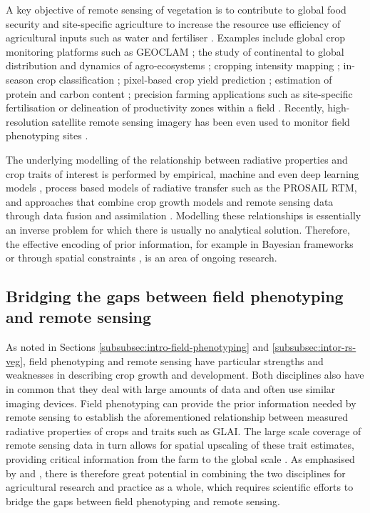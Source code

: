 A key objective of remote sensing of vegetation is to contribute to global food security and site-specific agriculture to increase the resource use efficiency of agricultural inputs such as water and fertiliser \citep{bach_sustainable_2018}. Examples include global crop monitoring platforms such as \gls{GEOCLAM} \citep{becker-reshef_strengthening_2020}; the study of continental to global distribution and dynamics of agro-ecosystems \citep{bolton_continental-scale_2020, dandrimont_detecting_2020, winkler_global_2021, moon_multiscale_2021}; cropping intensity mapping \citep{liu_mapping_2020}; in-season crop classification \citep{ruswurm_end--end_2023}; pixel-based crop yield prediction \citep{perich_pixel-based_2023}; estimation of protein and carbon content \cite{feret_prospect-pro_2021, longmire_estimation_2023}; precision farming applications such as site-specific fertilisation \citep{argento_site-specific_2021} or delineation of productivity zones within a field \citep{georgi_automatic_2018}. Recently, high-resolution satellite remote sensing imagery has been even used to monitor field phenotyping sites \citep{pinto_satellite_2023}.

The underlying modelling of the relationship between radiative properties and crop traits of interest is performed by empirical, machine and even deep learning models \citep{verrelst_quantifying_2019}, process based models of radiative transfer \citep{jacquemoud_prospectsail_2009} such as the PROSAIL \gls{RTM}, and approaches that combine crop growth models and remote sensing data through data fusion and assimilation \citep{ma_wheat_2022}. Modelling these relationships is essentially an inverse problem for which there is usually no analytical solution. Therefore, the effective encoding of prior information, for example in Bayesian frameworks \citep{zhang_towards_2023} or through spatial constraints \citep{atzberger_spatially_2012}, is an area of ongoing research.

\subsection{Bridging the gaps between field phenotyping and remote sensing}
As noted in Sections \ref{subsubsec:intro-field-phenotyping} and \ref{subsubsec:intor-rs-veg}, field phenotyping and remote sensing have particular strengths and weaknesses in describing crop growth and development. Both disciplines also have in common that they deal with large amounts of data and often use similar imaging devices. Field phenotyping can provide the prior information needed by remote sensing to establish the aforementioned relationship between measured radiative properties of crops and traits such as \gls{GLAI}. The large scale coverage of remote sensing data in turn allows for spatial upscaling of these trait estimates, providing critical information from the farm to the global scale \citep{weiss_remote_2020}. As emphasised by \cite{machwitz_bridging_2021} and \cite{walter_advances_2022}, there is therefore great potential in combining the two disciplines for agricultural research and practice as a whole, which requires scientific efforts to bridge the gaps between field phenotyping and remote sensing.

